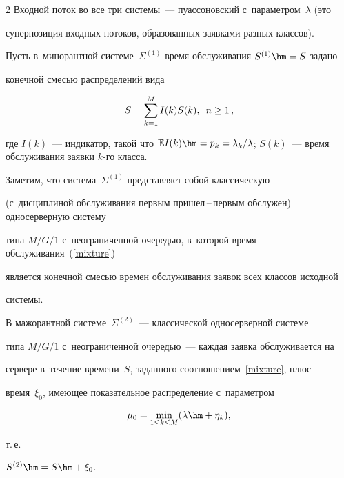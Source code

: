 \begin{multicols}{2}
Входной поток во все три сис\-те\-мы~--- пуассоновский  с~параметром~$\lambda$ (это 


суперпозиция входных потоков, образованных заявками разных классов).





Пусть в~минорантной сис\-те\-ме~$\Sigma^{(1)}$ время обслуживания $S^{(1)}\hm=S$ задано 


конечной смесью распределений вида


\begin{equation}


\label{mixture}


S=\sum\limits_{k=1}^M I(k) S(k), \enskip n\ge1\,,


\end{equation}


где  $I(k)$~--- индикатор, такой что  $\mathbb{E} I(k)\hm=p_k=\lambda_k/\lambda$; $S(k)$~--- время  обслуживания заявки $k$-го класса.


Заметим, что сис\-те\-ма~$\Sigma^{(1)}$ пред\-став\-ля\-ет собой классическую 


(с~дисциплиной обслуживания первым при\-шел\,--\,пер\-вым обслужен) односерверную сис\-те\-му 


типа $M/G/1$ с~неограниченной очередью, в~которой время обслуживания~(\ref{mixture})


является конечной смесью времен обслуживания заявок всех классов исходной 


сис\-те\-мы.





В мажорантной системе~$\Sigma^{(2)}$~--- классической односерверной сис\-те\-ме 


типа  $M/G/1$ с~неограниченной оче\-редью~--- каждая заявка обслуживается на 


сервере в~течение времени~$S$, заданного соотношением~\eqref{mixture},  плюс 


время~$\xi_0$, имеющее показательное распределение с~па\-ра\-мет\-ром  


$$


\mu_0=\min\limits_{1\le k\le M} (\lambda\hm+\eta_k),


$$


 т.\,е.






$S^{(2)} \hm= S\hm +\xi_0$.



\end{multicols}
